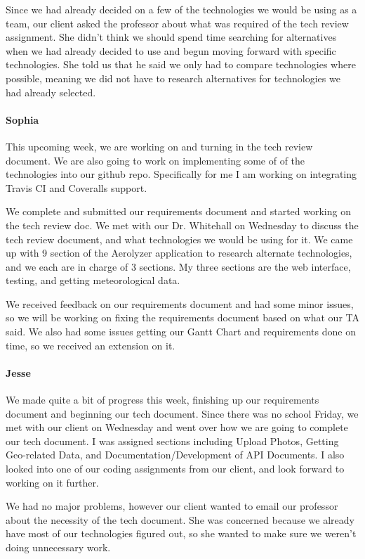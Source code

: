 \documentclass[onecolumn, draftclsnofoot,10pt, compsoc]{IEEEtran}
\begin{document}
\begin{flushleft}
Since we had already decided on a few of the technologies we would be using as a team, our client asked the professor about what was required of the tech review assignment. She didn't think we should spend time searching for alternatives when we had already decided to use and begun moving forward with specific technologies. She told us that he said we only had to compare technologies where possible, meaning we did not have to research alternatives for technologies we had already selected.
 
\paragraph{Sophia}
 
This upcoming week, we are working on and turning in the tech review document. We are also going to work on implementing some of of the technologies into our github repo. Specifically for me I am working on integrating Travis CI and Coveralls support.
 
 
We complete and submitted our requirements document and started working on the tech review doc. We met with our Dr. Whitehall on Wednesday to discuss the tech review document, and what technologies we would be using for it. We came up with 9 section of the Aerolyzer application to research alternate technologies, and we each are in charge of 3 sections. My three sections are the web interface, testing, and getting meteorological data.
 
 
We received feedback on our requirements document and had some minor issues, so we will be working on fixing the requirements document based on what our TA said. We also had some issues getting our Gantt Chart and requirements done on time, so we received an extension on it.
 
\paragraph{Jesse}
 
We made quite a bit of progress this week, finishing up our requirements document and beginning our tech document. Since there was no school Friday, we met with our client on Wednesday and went over how we are going to complete our tech document. I was assigned sections including Upload Photos, Getting Geo-related Data, and Documentation/Development of API Documents. I also looked into one of our coding assignments from our client, and look forward to working on it further.
 
 
We had no major problems, however our client wanted to email our professor about the necessity of the tech document. She was concerned because we already have most of our technologies figured out, so she wanted to make sure we weren't doing unnecessary work.
 

\end{flushleft}
\end{document}
